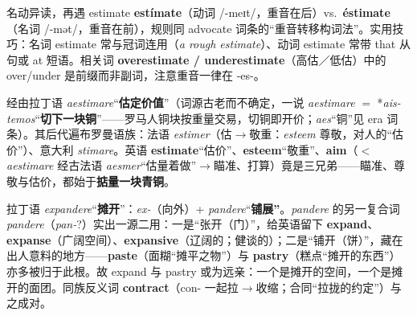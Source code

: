 \documentclass[../main.tex]{subfiles}
\begin{document}

\begin{gram}{名动异读，再遇 estimate}
\textbf{estímate}（动词 /-meɪt/，重音在后）vs.\ \textbf{éstimate}（名词 /-mət/，重音在前），规则同 advocate 词条的“重音转移构词法”。实用技巧：名词 estimate 常与冠词连用（\textit{a rough estimate}）、动词 estimate 常带 that 从句或 at 短语。相关词 \textbf{overestimate / underestimate}（高估／低估）中的 over/under 是前缀而非副词，注意重音一律在 -es-。
\end{gram}

\begin{origin}
经由拉丁语 \textit{aestimare}“\textbf{估定价值}”（词源古老而不确定，一说 \textit{aestimare} $=$ *\textit{ais-temos}“\textbf{切下一块铜}”——罗马人铜块按重量交易，切铜即开价；\textit{aes}“铜”见 era 词条）。其后代遍布罗曼语族：法语 \textit{estimer}（估$\to$敬重：\textit{esteem} 尊敬，对人的“估价”）、意大利 \textit{stimare}。英语 \textbf{estimate}“估价”、\textbf{esteem}“敬重”、\textbf{aim}（$<$\textit{aestimare} 经古法语 \textit{aesmer}“估量着做”$\to$瞄准、打算）竟是三兄弟——瞄准、尊敬与估价，都始于\textbf{掂量一块青铜}。
\end{origin}




\begin{origin}
拉丁语 \textit{expandere}“\textbf{摊开}”：\textit{ex-}（向外）+ \textit{pandere}“\textbf{铺展”}。\textit{pandere} 的另一复合词 \textit{pandere}（\textit{pan-}?）实出一源二用：一是“张开（门）”，给英语留下 \textbf{expand}、\textbf{expanse}（广阔空间）、\textbf{expansive}（辽阔的；健谈的）；二是“铺开（饼）”，藏在出人意料的地方——\textbf{paste}（面糊“摊平之物”）与 \textbf{pastry}（糕点“摊开的东西”）亦多被归于此根。故 expand 与 pastry 或为远亲：一个是摊开的空间，一个是摊开的面团。同族反义词 \textbf{contract}（con- 一起拉$\to$收缩；合同“拉拢的约定”）与之成对。
\end{origin}
\end{document}
